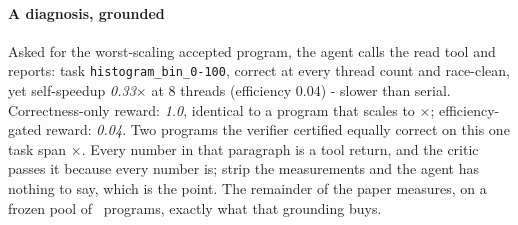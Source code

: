 \paragraph*{A diagnosis, grounded}
Asked for the worst-scaling accepted program, the agent calls the read tool and
reports: task \texttt{histogram\_bin\_0-100}, correct at every thread count and
race-clean, yet self-speedup \emph{0.33}$\times$ at 8 threads (efficiency
0.04) - slower than serial. Correctness-only reward: \emph{1.0}, identical to a
program that scales to \SpeedMax$\times$; efficiency-gated reward:
\emph{0.04}. Two programs the verifier certified equally correct on this one
task span \WorstTaskRange$\times$. Every number in that paragraph is a tool
return, and the critic passes it because every number is; strip the measurements
and the agent has nothing to say, which is the point. The remainder of the paper
measures, on a frozen pool of \NAccepted\ programs, exactly what that grounding
buys.
